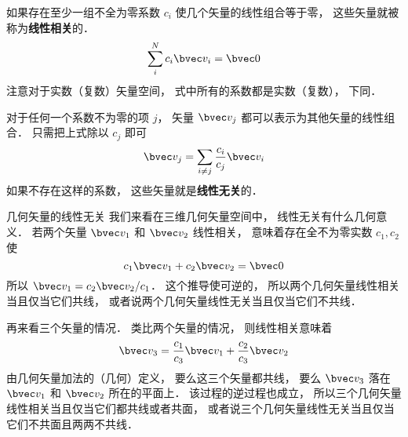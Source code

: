 

如果存在至少一组不全为零系数 $c_i$ 使几个矢量的线性组合等于零， 这些矢量就被称为\textbf{线性相关}的．
\begin{equation}
\sum_i^N c_i \bvec v_i = \bvec 0
\end{equation}
注意对于实数（复数）矢量空间， 式中所有的系数都是实数（复数）， 下同．

对于任何一个系数不为零的项 $j$， 矢量 $\bvec v_j$ 都可以表示为其他矢量的线性组合． 只需把上式除以 $c_j$ 即可
\begin{equation}
\bvec v_j = \sum_{i \ne j}\frac{c_i}{c_j} \bvec v_i
\end{equation}
如果不存在这样的系数， 这些矢量就是\textbf{线性无关}的．

\begin{example}{几何矢量的线性无关}\label{LinInd_ex2}
我们来看在三维几何矢量空间中， 线性无关有什么几何意义． 若两个矢量 $\bvec v_1$ 和 $\bvec v_2$ 线性相关， 意味着存在全不为零实数 $c_1, c_2$ 使
\begin{equation}
c_1 \bvec v_1 + c_2 \bvec v_2 = \bvec 0
\end{equation}
所以 $\bvec v_1 = c_2 \bvec v_2 / c_1$． 这个推导使可逆的， 所以两个几何矢量线性相关当且仅当它们共线， 或者说两个几何矢量线性无关当且仅当它们不共线．

再来看三个矢量的情况． 类比两个矢量的情况， 则线性相关意味着
\begin{equation}
\bvec v_3 = \frac{c_1}{c_3} \bvec v_1 +  \frac{c_2}{c_3} \bvec v_2
\end{equation}
由几何矢量加法的（几何）定义， 要么这三个矢量都共线， 要么 $\bvec v_3$ 落在 $\bvec v_1$ 和 $\bvec v_2$ 所在的平面上． 该过程的逆过程也成立， 所以三个几何矢量线性相关当且仅当它们都共线或者共面， 或者说三个几何矢量线性无关当且仅当它们不共面且两两不共线．
\end{example}
